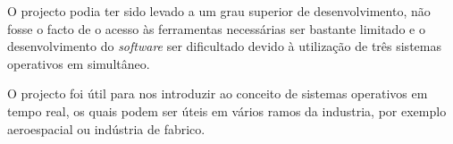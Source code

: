 \documentclass[a4paper]{article}
\begin{document}
    O projecto podia ter sido levado a um grau superior de desenvolvimento, não fosse o facto de o acesso às ferramentas necessárias ser bastante limitado e o desenvolvimento do \textit{software} ser dificultado devido à utilização de três sistemas operativos em simultâneo.

	O projecto foi útil para nos introduzir ao conceito de sistemas operativos em tempo real, os quais podem ser úteis em vários ramos da industria, por exemplo aeroespacial ou indústria de fabrico.
    
\end{document}
